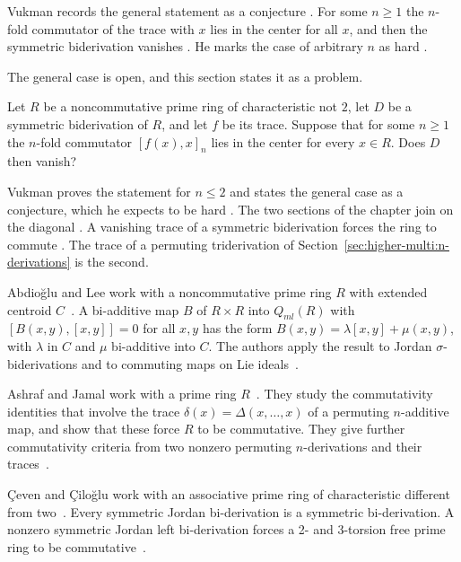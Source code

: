 Vukman records the general statement as a conjecture
\cite[pp.~188--189]{Vukman1990Two}. For some $n\geq 1$ the $n$-fold
commutator of the trace with $x$ lies in the center for all $x$, and then
the symmetric biderivation vanishes \cite[pp.~188--189]{Vukman1990Two}. He
marks the case of arbitrary $n$ as hard \cite[p.~189]{Vukman1990Two}.

The general case is open, and this section states it as a problem.

\begin{problem}\label{prob:open:vukman}
Let $R$ be a noncommutative prime ring of characteristic not $2$, let $D$ be a
symmetric biderivation of $R$, and let $f$ be its trace.
Suppose that for some $n\ge1$ the $n$-fold commutator $[f(x),x]_n$ lies in the
center for every $x\in R$.
Does $D$ then vanish?
\end{problem}

Vukman proves the statement for $n\le2$ \cite[Theorem~2,
p.~184]{Vukman1990Two} and states the general case as a conjecture, which he
expects to be hard \cite[pp.~188--189]{Vukman1990Two}. The two sections of the
chapter join on the diagonal \cite[p.~490]{Yazarli2017Trideriv}. A vanishing
trace of a symmetric biderivation forces the ring to commute
\cite[p.~187]{Vukman1990Two}. The trace of a permuting triderivation of
Section~\ref{sec:higher-multi:n-derivations} is the second.

Abdio\u{g}lu and Lee work with a noncommutative prime ring $R$ with extended
centroid $C$~\cite{WlABasicFunctionalIdentityWithAp2017}. A bi-additive map $B$ of $R\times R$ into $Q_{ml}(R)$ with
$[B(x,y),[x,y]]=0$ for all $x,y$ has the form
$B(x,y)=\lambda[x,y]+\mu(x,y)$, with $\lambda$ in $C$ and $\mu$ bi-additive
into $C$. The authors apply the result to Jordan $\sigma$-biderivations and to
commuting maps on Lie ideals~\cite{WlABasicFunctionalIdentityWithAp2017}.

Ashraf and Jamal work with a prime ring $R$~\cite{WlTracesOfPermutingNAdditiveMaps2014}. They study the commutativity
identities that involve the trace $\delta(x)=\Delta(x,\dots,x)$ of a permuting
$n$-additive map, and show that these force $R$ to be commutative.
They give further commutativity
criteria from two nonzero permuting $n$-derivations and their
traces~\cite{WlTracesOfPermutingNAdditiveMaps2014}.

\c{C}even
and \c{C}ilo\u{g}lu work with an associative prime ring of characteristic
different from two~\cite{WlOnSymmetricJordanAndJordanLeft2018}. Every symmetric Jordan bi-derivation is a
symmetric bi-derivation. A nonzero symmetric Jordan left
bi-derivation forces a 2- and 3-torsion free prime ring to be
commutative~\cite{WlOnSymmetricJordanAndJordanLeft2018}.

